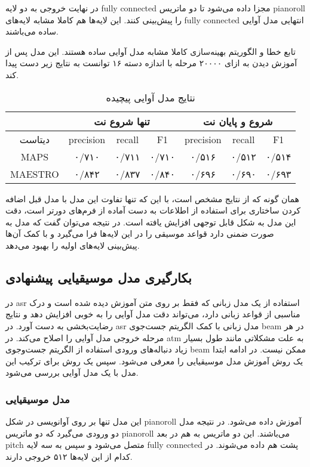 در نهایت خروجی به دو لایه \gls{fully connected} مجزا داده می‌شود تا دو ماتریس
\gls{pianoroll} را پیش‌بینی کنند. این لایه‌ها هم کاملا مشابه لایه‌های \gls{fully
connected} انتهایی مدل آوایی ساده می‌باشند.

تابع خطا و الگوریتم بهینه‌سازی کاملا مشابه مدل آوایی ساده هستند. این مدل پس از
آموزش دیدن به ازای ۲۰۰۰۰ مرحله با اندازه دسته ۱۶ توانست به نتایج زیر دست پیدا
کند.
\begin{table}[ht]
    \centering
    \begin{tabular}{|c|c|c|c|c|c|c|}
        \hline
        & \multicolumn{3}{|c|}{تنها شروع نت} & \multicolumn{3}{|c|}{شروع و پایان نت} \\
        \hline
        دیتاست & \gls{precision} & \gls{recall} & F1 & \gls{precision} & \gls{recall} & F1 \\
        \hline
        MAPS & ۰/۷۱۰ & ۰/۷۱۱ & ۰/۷۱۰ & ۰/۵۱۶ & ۰/۵۱۲ & ۰/۵۱۴ \\
        \hline
        MAESTRO & ۰/۸۴۲ & ۰/۸۳۷ & ۰/۸۴۰ & ۰/۶۹۶ & ۰/۶۹۰ & ۰/۶۹۳ \\
        \hline
    \end{tabular}
    \caption{نتایج مدل آوایی پیچیده}
\end{table}

همان گونه که از نتایج مشخص است، با این که تنها تفاوت این مدل با مدل قبل اضافه
کردن ساختاری برای استفاده از اطلاعات به دست آماده از فرم‌های دورتر است، دقت این
مدل به شکل قابل توجهی افزایش یافته است. در نتیجه می‌توان گفت که مدل به صورت ضمنی
دارد قواعد موسیقی را در این لایه‌ها فرا می‌گیرد و با کمک آن‌ها پیش‌بینی لایه‌های
اولیه را بهبود می‌دهد.

\subsection{بکارگیری مدل موسیقیایی پیشنهادی}
در \gls{asr} استفاده از یک مدل زبانی که فقط بر روی متن آموزش دیده شده است و درک
مناسبی از قواعد زبانی دارد، می‌تواند دقت مدل آوایی را به خوبی افزایش دهد و نتایج
رضایت‌بخشی به دست آورد. در \gls{asr} مدل زبانی با کمک الگریتم جست‌جوی beam در هر
مرحله خروجی مدل آوایی را اصلاح می‌کند. در \gls{atm} به علت مشکلاتی مانند طول
بسیار زیاد دنباله‌های ورودی استفاده از الگریتم جست‌وجوی beam ممکن نیست. در
ادامه ابتدا یک روش آموزش مدل موسیقیایی را معرفی می‌شود. سپس یک روش برای ترکیب
این مدل با یک مدل آوایی بررسی می‌شود.

\subsubsection{مدل موسیقیایی}
این مدل تنها بر روی آوانویسی در شکل \gls{pianoroll} آموزش داده می‌شود. در نتیجه
مدل دو ورودی می‌گیرد که دو ماتریس \gls{pianoroll} می‌باشند. این دو ماتریس به هم
در بعد \gls{pitch} متصل می‌شود و سپس به سه لایه \gls{fully connected} پشت هم
داده می‌شوند. در کدام از این لایه‌ها ۵۱۲ خروجی دارند.

